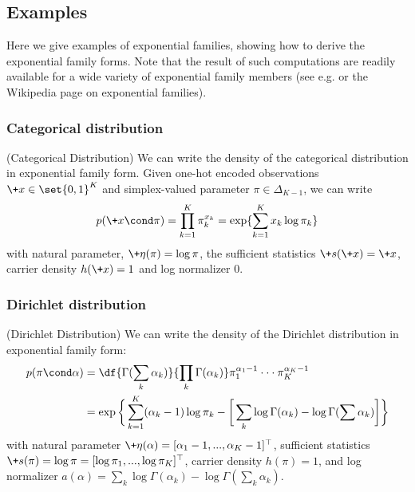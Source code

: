 \documentclass{article} %
\newcommand{\obs}{\+x}
\newcommand{\obsScalar}{x}
\newcommand{\logNormalizerFunction}{a}
\newcommand{\sufficientStatsFunction}{\+s}
\newcommand{\carrierDensity}{h}
\newcommand{\naturalParam}{\+\eta}
\begin{document}
\subsection{Examples}

Here we give examples of exponential families, showing how to derive the exponential family forms.   Note that the result of such computations are readily available for a wide variety of exponential family members (see e.g. \cite{nielsen2009statistical} or the Wikipedia page on exponential families). 

 
\subsubsection{Categorical distribution}

\begin{example}{(Categorical Distribution)}
\label{ex:categorical_as_ef} We can write the density of the categorical distribution in exponential family form. 	 Given one-hot encoded observations $\obs \in \set{0,1}^K$ and simplex-valued parameter $\pi \in \Delta_{K-1}$, we can write
\[p(\obs \cond \pi) = \prod_{k=1}^K \pi_k^{\obsScalar_k} = \exp \{ \sum_{k=1}^K \obsScalar_k \log \pi_k\} \]
 with natural parameter, $\naturalParam(\pi) = \log \pi$, the sufficient statistics $\sufficientStatsFunction(\obs) = \obs$, carrier density $\carrierDensity(\obs)=1$ and log normalizer $0$.
\end{example}

\subsubsection{Dirichlet distribution}
\begin{example}{(Dirichlet Distribution)} 
\label{ex:dirichlet_as_ef} We can write the density of the Dirichlet distribution in exponential family form:
\begin{align*}
p (\pi \cond\alpha) &= \df{\Gamma(\sum_k \alpha_k)}{\prod_k \Gamma (\alpha_k) } \pi_1^{\alpha_1 -1} \cdot \cdot \cdot \pi_K^{\alpha_K -1} \\
&= \exp \bigg\{ \sum_{k=1}^K (\alpha_k -1) \log \pi_k - \bigg[ \sum_k \log \Gamma (\alpha_k)-  \log \Gamma (\sum \alpha_k) \bigg]  \bigg\}
\end{align*}
with natural parameter $\naturalParam(\alpha) = [\alpha_1 -1, ..., \alpha_K -1]^\top$, sufficient statistics $\sufficientStatsFunction(\pi) = \log \pi = [\log \pi_1, ..., \log \pi_K]^\top$, carrier density $\carrierDensity(\pi)=1$, and log normalizer $\logNormalizerFunction(\alpha) =  \sum_k \log \Gamma (\alpha_k ) - \log \Gamma (\sum_k \alpha_k)$. 
  
\end{example} 
\end{document}
